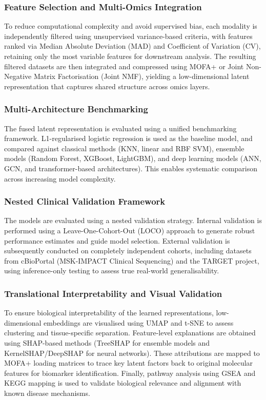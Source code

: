 \documentclass[conference]{IEEEtran}
\begin{document}
\subsubsection{\textbf{Feature Selection and Multi-Omics Integration}} To reduce computational complexity and avoid supervised bias, each modality is independently filtered using unsupervised variance-based criteria, with features ranked via Median Absolute Deviation (MAD) and Coefficient of Variation (CV), retaining only the most variable features for downstream analysis. The resulting filtered datasets are then integrated and compressed using MOFA+ or Joint Non-Negative Matrix Factorisation (Joint NMF), yielding a low-dimensional latent representation that captures shared structure across omics layers.
\subsubsection{\textbf{Multi-Architecture Benchmarking}} The fused latent representation is evaluated using a unified benchmarking framework. L1-regularised logistic regression is used as the baseline model, and compared against classical methods (KNN, linear and RBF SVM), ensemble models (Random Forest, XGBoost, LightGBM), and deep learning models (ANN, GCN, and transformer-based architectures). This enables systematic comparison across increasing model complexity.
\subsubsection{\textbf{Nested Clinical Validation Framework}} The models are evaluated using a nested validation strategy. Internal validation is performed using a Leave-One-Cohort-Out (LOCO) approach to generate robust performance estimates and guide model selection. External validation is subsequently conducted on completely independent cohorts, including datasets from cBioPortal (MSK-IMPACT Clinical Sequencing) and the TARGET project, using inference-only testing to assess true real-world generalisability.
\subsubsection{\textbf{Translational Interpretability and Visual Validation}} To ensure biological interpretability of the learned representations, low-dimensional embeddings are visualised using UMAP and t-SNE to assess clustering and tissue-specific separation. Feature-level explanations are obtained using SHAP-based methods (TreeSHAP for ensemble models and KernelSHAP/DeepSHAP for neural networks). These attributions are mapped to MOFA+ loading matrices to trace key latent factors back to original molecular features for biomarker identification. Finally, pathway analysis using GSEA and KEGG mapping is used to validate biological relevance and alignment with known disease mechanisms.
\end{document}
